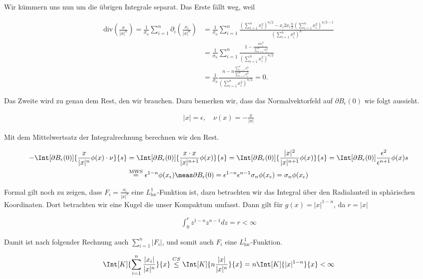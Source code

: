 \begin{solution}
Wir kümmern uns nun um die übrigen Integrale separat.
Das Erste fällt weg, weil

\begin{align*}
  \mathrm{div}\left(\frac{x}{|x|^n}\right)
  =\frac{1}{\sigma_n}\sum_{i=1}^n\partial_i\left(\frac{x_i}{|x|^n}\right)
  &= \frac{1}{\sigma_n}\sum_{i=1}^n\frac{\left(\sum_{i=1}^nx_i^2\right)^{n/2} - x_i2x_i\frac{n}{2}\left(\sum_{i=1}^nx_i^2\right)^{n/2 - 1}}{\left(\sum_{i=1}^nx_i^2\right)^n} \\
  &= \frac{1}{\sigma_n}\sum_{i=1}^n\frac{1 - \frac{nx_i^2}{\sum_{i=1}^nx_i^2}}{\left(\sum_{i=1}^nx_i^2\right)^{n/2}} \\
  &= \frac{1}{\sigma_n}\frac{n - n\frac{\sum_{i=1}^nx_i^2}{\sum_{i=1}^nx_i^2}}{\left(\sum_{i=1}^nx_i^2\right)^{n/2}} = 0.
\end{align*}

Das Zweite wird zu genau dem Rest, den wir brauchen.
Dazu bemerken wir, dass das Normalvektorfeld auf $\partial B_\epsilon(0)$ wie folgt aussieht.

\begin{align*}
  |x| = \epsilon,
  \quad
  \nu(x)
  =
  -\frac{x}{|x|}
\end{align*}

Mit dem Mittelwertsatz der Integralrechnung berechnen wir den Rest.

\begin{multline*}
  -\Int
  [\partial B_\epsilon(0)]
  {
    \frac{x}{|x|^n}
    \phi(x)
    \cdot
    \nu
  }{s}
  =
  \Int
  [\partial B_\epsilon(0)]
  {
    \frac{x \cdot x}{|x|^{n+1}}
    \phi(x)
  }{s}
  =
  \Int
  [\partial B_\epsilon(0)]
  {
    \frac{|x|^2}{|x|^{n+1}}
    \phi(x)
  }{s}
  =
  \Int
  [\partial B_{\epsilon}(0)]
  {
    \frac{\epsilon^2}{\epsilon^{n+1}}
    \phi(x)
  }{s} \\
  \stackrel{\text{MWS}}{=}
  \epsilon^{1-n}
  \phi(x_\epsilon)
  \meas \partial B_{\epsilon}(0)
  =
  \epsilon^{1-n}
  \epsilon^{n-1}
  \sigma_n
  \phi(x_\epsilon)
  =
  \sigma_n
  \phi(x_{\epsilon})
\end{multline*}

Formal gilt noch zu zeigen, dass $F_i = \frac{x_i}{|x|^n}$ eine $L^1_{\mathrm{loc}}$-Funktion ist, dazu betrachten wir
das Integral über den Radialanteil in sphärischen Koordinaten. Dort betrachten wir eine Kugel die unser Kompaktum umfasst. Dann gilt
für $g(x) = |x|^{1-n}$, da $r = |x|$

\begin{align*}
  \int_0^r z^{1-n}z^{n-1} dz = r
  <
  \infty
\end{align*}

Damit ist nach folgender Rechnung auch $\sum_{i=1}^n |F_i|$, und somit auch $F_i$ eine $L^1_{\mathrm{loc}}$-Funktion.

\begin{align*}
  \Int[K]
  {
    \sum_{i=1}^n\frac{|x_i|}{|x|^n}
  }{x}
  \stackrel{CS}{\leq}
  \Int[K]
  {
   n \frac{|x|}{|x|^n}
  }{x}
  =
  n\Int[K]
  {
    |x|^{1-n}
  }{x}
  <
  \infty
\end{align*}

\end{solution}

